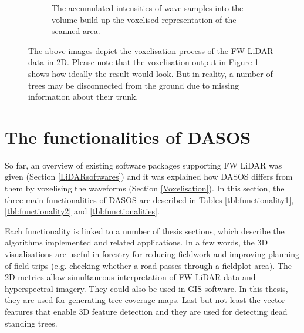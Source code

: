 \documentclass{subfiles}
\begin{document}
{\begin{figure} [h!]
\begin{subfigure}[t]{.31\textwidth}
				\caption{The accumulated intensities of wave samples into the volume build up the voxelised representation of the scanned area.} 
				\label{fig:VoxelisationC_voxelised}
			\end{subfigure}
			\caption[Voxelisation of FW LiDAR data]{The above images depict the voxelisation process of the FW LiDAR data in 2D. Please note that the voxelisation output in Figure \ref{fig:VoxelisationC_voxelised} shows how ideally the result would look. But in reality, a number of trees may be disconnected from the ground due to missing information about their trunk. \footnotemark }  
			\label{fig:Voxelisation} 
		\end{figure}
		
	}
			

	\section{The functionalities of DASOS}\label{DASOS}
	
		\par So far, an overview of existing software packages supporting FW LiDAR was given (Section \ref{LiDARsoftwares}) and it was explained how DASOS differs from them by voxelising the waveforms (Section \ref{Voxelisation}). In this section, the three main functionalities of DASOS are described in Tables \ref{tbl:functionality1}, \ref{tbl:functionality2} and \ref{tbl:functionalities}.
		
	  	\par Each functionality is linked to a number of thesis sections, which describe the algorithms implemented and related applications. {\color{blue} In a few words, the 3D visualisations are useful in forestry for reducing fieldwork and improving planning of field trips (e.g. checking whether a road passes through a fieldplot area). The 2D metrics allow simultaneous interpretation of FW LiDAR data and hyperspectral imagery. They could also be used in GIS software. In this thesis, they are used for generating tree coverage maps. Last but not least the vector features that enable 3D feature detection and they are used for detecting dead standing trees.}
\end{document}

